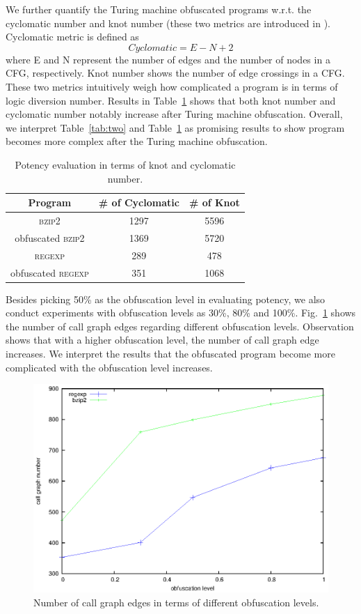 \documentclass[lnicst]{svmultln}
\newcommand{\F}{Fig.}
\begin{document}
We further quantify the Turing machine obfuscated programs w.r.t. the cyclomatic
number and knot number (these two metrics are introduced in
\cite{McCabe,Woodward}). Cyclomatic metric is defined as \[ Cyclomatic = E - N +
2 \] where E and N represent the number of edges and the number of nodes in a
CFG, respectively. Knot number shows the number of edge crossings in a CFG.
These two metrics intuitively weigh how complicated a program is in terms of
logic diversion number. Results in Table~\ref{tab:three} shows that both knot
number and cyclomatic number notably increase after Turing machine obfuscation.
Overall, we interpret Table~\ref{tab:two} and Table~\ref{tab:three} as promising
results to show program becomes more complex after the Turing machine
obfuscation.

\begin{table}
  \centering
 \caption{Potency evaluation in terms of knot and cyclomatic number.}
 \label{tab:three}
 \begin{tabular}{|c|c|c|}
 \hline 
 \textbf{Program} & \textbf{\# of Cyclomatic} & \textbf{\# of Knot} \\
 \hline
\textsc{bzip2} & 1297 & 5596  \\ 
 \hline
obfuscated \textsc{bzip2} & 1369 & 5720  \\
 \hline
\textsc{regexp} & 289 & 478 \\ 
 \hline
obfuscated \textsc{regexp} & 351 & 1068 \\
 \hline
\end{tabular}
\end{table}

Besides picking 50\% as the obfuscation level in evaluating potency, we also
conduct experiments with obfuscation levels as 30\%, 80\% and 100\%.
\F~\ref{fig:seven} shows the number of call graph edges regarding different
obfuscation levels. Observation shows that with a higher obfuscation level, the
number of call graph edge increases. We interpret the results that the
obfuscated program become more complicated with the obfuscation level increases.

\begin{figure}
  \includegraphics[width=0.9\linewidth]{cg.eps}
  \caption{Number of call graph edges in terms of different obfuscation levels.}
  \label{fig:seven}
\end{figure}
\end{document}
